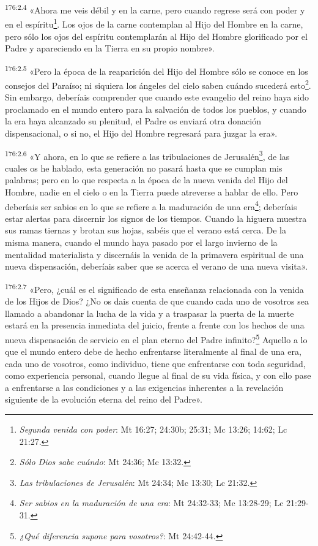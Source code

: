 \par
\textsuperscript{176:2.4} «Ahora me veis débil y en la carne, pero cuando regrese será con poder y en el espíritu\footnote{\textit{Segunda venida con poder}: Mt 16:27; 24:30b; 25:31; Mc 13:26; 14:62; Lc 21:27.}. Los ojos de la carne contemplan al Hijo del Hombre en la carne, pero sólo los ojos del espíritu contemplarán al Hijo del Hombre glorificado por el Padre y apareciendo en la Tierra en su propio nombre».

\par
\textsuperscript{176:2.5} «Pero la época de la reaparición del Hijo del Hombre sólo se conoce en los consejos del Paraíso; ni siquiera los ángeles del cielo saben cuándo sucederá esto\footnote{\textit{Sólo Dios sabe cuándo}: Mt 24:36; Mc 13:32.}. Sin embargo, deberíais comprender que cuando este evangelio del reino haya sido proclamado en el mundo entero para la salvación de todos los pueblos, y cuando la era haya alcanzado su plenitud, el Padre os enviará otra donación dispensacional, o si no, el Hijo del Hombre regresará para juzgar la era».

\par
\textsuperscript{176:2.6} «Y ahora, en lo que se refiere a las tribulaciones de Jerusalén\footnote{\textit{Las tribulaciones de Jerusalén}: Mt 24:34; Mc 13:30; Lc 21:32.}, de las cuales os he hablado, esta generación no pasará hasta que se cumplan mis palabras; pero en lo que respecta a la época de la nueva venida del Hijo del Hombre, nadie en el cielo o en la Tierra puede atreverse a hablar de ello. Pero deberíais ser sabios en lo que se refiere a la maduración de una era\footnote{\textit{Ser sabios en la maduración de una era}: Mt 24:32-33; Mc 13:28-29; Lc 21:29-31.}; deberíais estar alertas para discernir los signos de los tiempos. Cuando la higuera muestra sus ramas tiernas y brotan sus hojas, sabéis que el verano está cerca. De la misma manera, cuando el mundo haya pasado por el largo invierno de la mentalidad materialista y discernáis la venida de la primavera espiritual de una nueva dispensación, deberíais saber que se acerca el verano de una nueva visita».

\par
\textsuperscript{176:2.7} «Pero, ¿cuál es el significado de esta enseñanza relacionada con la venida de los Hijos de Dios? ¿No os dais cuenta de que cuando cada uno de vosotros sea llamado a abandonar la lucha de la vida y a traspasar la puerta de la muerte estará en la presencia inmediata del juicio, frente a frente con los hechos de una nueva dispensación de servicio en el plan eterno del Padre infinito?\footnote{\textit{¿Qué diferencia supone para vosotros?}: Mt 24:42-44.} Aquello a lo que el mundo entero debe de hecho enfrentarse literalmente al final de una era, cada uno de vosotros, como individuo, tiene que enfrentarse con toda seguridad, como experiencia personal, cuando llegue al final de su vida física, y con ello pase a enfrentarse a las condiciones y a las exigencias inherentes a la revelación siguiente de la evolución eterna del reino del Padre».

